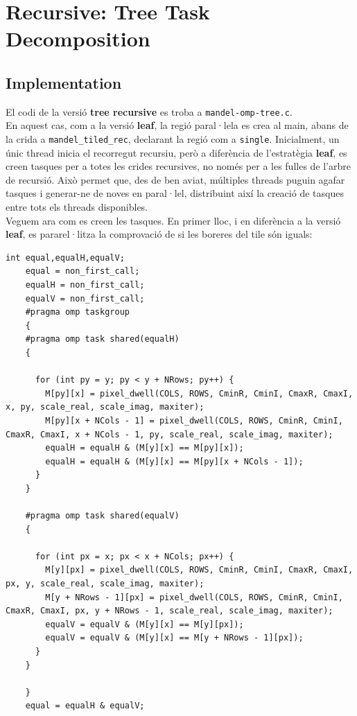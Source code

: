 \section{Recursive: Tree Task Decomposition}
\label{sec:rec-tree}

\subsection{Implementation}
\label{sec:rec-tree-impl}
El codi de la versió \textbf{tree recursive} es troba a \texttt{mandel-omp-tree.c}.\\
En aquest cas, com a la versió \textbf{leaf}, la regió paral·lela es crea al main, abans de la crida a \texttt{mandel\_tiled\_rec}, declarant la regió com a \texttt{single}. Inicialment, un únic thread inicia el recorregut recursiu, però a diferència de l'estratègia \textbf{leaf}, es creen tasques per a totes les crides recursives, no només per a les fulles de l'arbre de recursió. Això permet que, des de ben aviat, múltiples threads puguin agafar tasques i generar-ne de noves en paral·lel, distribuint així la creació de tasques entre tots els threads disponibles.\\
Veguem ara com es creen les tasques. En primer lloc, i en diferència a la versió \textbf{leaf}, es pararel·litza la comprovació de si les boreres del tile són iguals:
\begin{lstlisting}[caption={Creació de tasques per a la comprovació de les boreres.},label={lst:rec-tree-tasks}]
    int equal,equalH,equalV;
    equal = non_first_call;
	equalH = non_first_call;
	equalV = non_first_call;
	#pragma omp taskgroup
	{
	#pragma omp task shared(equalH)
	{

      for (int py = y; py < y + NRows; py++) {
	    M[py][x] = pixel_dwell(COLS, ROWS, CminR, CminI, CmaxR, CmaxI, x, py, scale_real, scale_imag, maxiter);
	    M[py][x + NCols - 1] = pixel_dwell(COLS, ROWS, CminR, CminI, CmaxR, CmaxI, x + NCols - 1, py, scale_real, scale_imag, maxiter);
	    equalH = equalH & (M[y][x] == M[py][x]);
	    equalH = equalH & (M[y][x] == M[py][x + NCols - 1]);
      }
	}

	#pragma omp task shared(equalV)
	{
	
      for (int px = x; px < x + NCols; px++) {
	    M[y][px] = pixel_dwell(COLS, ROWS, CminR, CminI, CmaxR, CmaxI, px, y, scale_real, scale_imag, maxiter);
	    M[y + NRows - 1][px] = pixel_dwell(COLS, ROWS, CminR, CminI, CmaxR, CmaxI, px, y + NRows - 1, scale_real, scale_imag, maxiter);
	    equalV = equalV & (M[y][x] == M[y][px]);
	    equalV = equalV & (M[y][x] == M[y + NRows - 1][px]);
      }
	}

	}
	equal = equalH & equalV;
\end{lstlisting}

